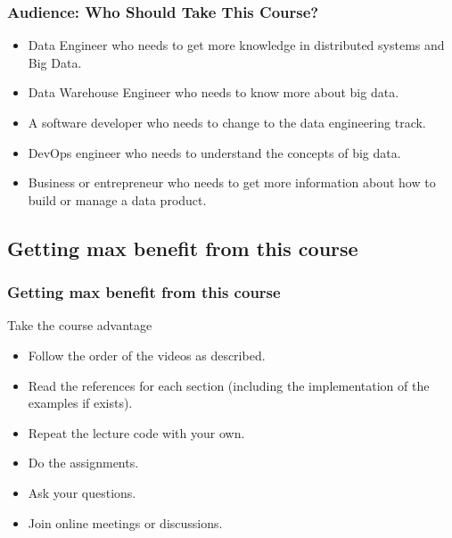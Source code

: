 \begin{frame}
\frametitle{Audience: Who Should Take This Course?}

\begin{itemize}[<+->]
	\item Data Engineer who needs to get more knowledge in distributed systems and Big Data.
	\item Data Warehouse Engineer who needs to know more about big data.
	\item A software developer who needs to change to the data engineering track. 
	\item DevOps engineer who needs to understand the concepts of big data.  
	\item Business or entrepreneur who needs to get more information about how to build or manage a data product.
\end{itemize}

\end{frame}

\subsection{Getting max benefit from this course}

\begin{frame}
\frametitle{Getting max benefit from this course}
\begin{block}{Take the course advantage}
	\begin{itemize}[<+->]
		\item Follow the order of the videos as described.
		\item Read the references for each section (including the implementation of the examples if exists). 
		\item Repeat the lecture code with your own.  
		\item Do the assignments.
		\item Ask your questions. 
		\item Join online meetings or discussions. 
	\end{itemize}
\end{block}

\end{frame}

